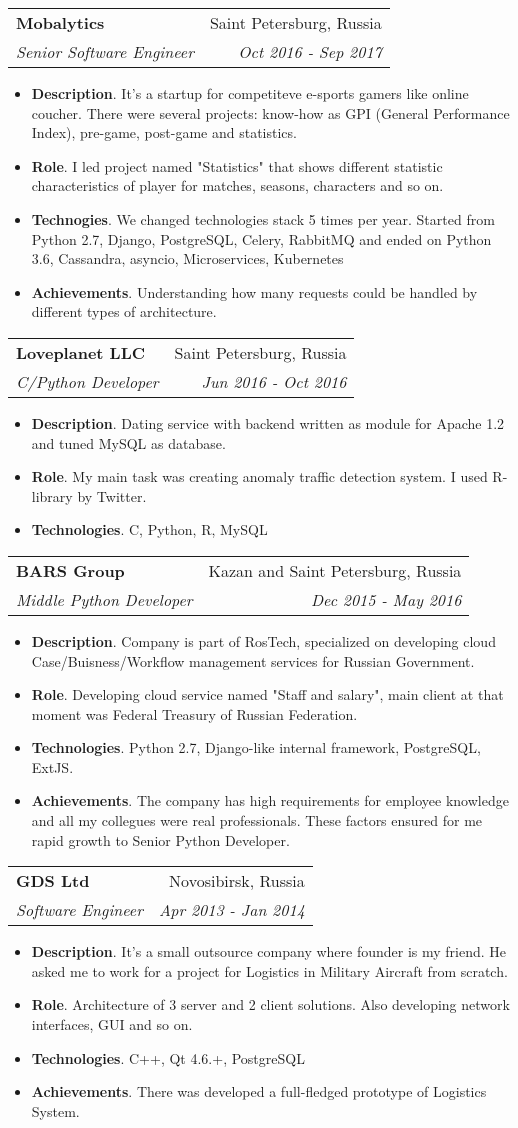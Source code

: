 \documentclass[letterpaper,11pt]{article}
\makeatletter
\newcommand{\resumeItem}[2]{
  \item\small{
    \textbf{#1}{. #2 \vspace{-2pt}}
  }
}
\newcommand{\resumeSubheading}[4]{
  \vspace{-1pt}\item
    \begin{tabular*}{0.97\textwidth}{l@{\extracolsep{\fill}}r}
      \textbf{#1} & #2 \\
      \textit{\small#3} & \textit{\small #4} \\
    \end{tabular*}\vspace{-5pt}
}
\newcommand{\resumeItemListStart}{\begin{itemize}}
\newcommand{\resumeItemListEnd}{\end{itemize}\vspace{-5pt}}
\makeatother
\begin{document}
    \resumeSubheading
      {Mobalytics}{Saint Petersburg, Russia}
      {Senior Software Engineer}{Oct 2016 - Sep 2017}
      \resumeItemListStart
        \resumeItem{Description}
          {It's a startup for competiteve e-sports gamers like online coucher. There were several projects: know-how as GPI (General Performance Index), pre-game, post-game and statistics.}
	\resumeItem{Role}
	  {I led project named "Statistics" that shows different statistic characteristics of player for matches, seasons, characters and so on.}
        \resumeItem{Technogies}
	  {We changed technologies stack 5 times per year. Started from Python 2.7, Django, PostgreSQL, Celery, RabbitMQ and ended on Python 3.6, Cassandra, asyncio, Microservices, Kubernetes}
	\resumeItem{Achievements}{Understanding how many requests could be handled by different types of architecture.}
      \resumeItemListEnd

     \resumeSubheading
       {Loveplanet LLC}{Saint Petersburg, Russia}
       {C/Python Developer}{Jun 2016 - Oct 2016}
       \resumeItemListStart
         \resumeItem{Description}
	   {Dating service with backend written as module for Apache 1.2 and tuned MySQL as database.}
	 \resumeItem{Role}
	   {My main task was creating anomaly traffic detection system. I used R-library by Twitter.}
	 \resumeItem{Technologies}
	   {C, Python, R, MySQL}
       \resumeItemListEnd

     \resumeSubheading
       {BARS Group}{Kazan and Saint Petersburg, Russia}
       {Middle Python Developer}{Dec 2015 - May 2016}
       \resumeItemListStart
         \resumeItem{Description}
	   {Company is part of RosTech, specialized on developing cloud Case/Buisness/Workflow management services for Russian Government.}
	 \resumeItem{Role}
	   {Developing cloud service named "Staff and salary", main client at that moment was Federal Treasury of Russian Federation.}
	 \resumeItem{Technologies}
	   {Python 2.7, Django-like internal framework, PostgreSQL, ExtJS.}
	 \resumeItem{Achievements}{The company has high requirements for employee knowledge and all my collegues were real professionals. These factors ensured for me rapid growth to Senior Python Developer.}
       \resumeItemListEnd

     \resumeSubheading
       {GDS Ltd}{Novosibirsk, Russia}
       {Software Engineer}{Apr 2013 - Jan 2014}
       \resumeItemListStart
         \resumeItem{Description}
	   {It's a small outsource company where founder is my friend. He asked me to work for a project for Logistics in Military Aircraft from scratch.}
	 \resumeItem{Role}
	   {Architecture of 3 server and 2 client solutions. Also developing network interfaces, GUI and so on.}
	 \resumeItem{Technologies}
	   {C++, Qt 4.6.+, PostgreSQL}
	 \resumeItem{Achievements}{There was developed a full-fledged prototype of Logistics System.}
       \resumeItemListEnd
\end{document}
